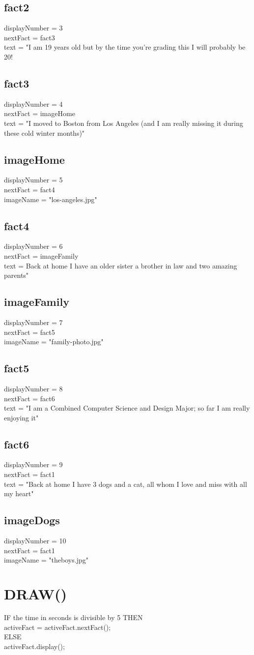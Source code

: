 \documentclass{article}
\begin{document}
        \subsection{fact2}displayNumber = 3 \\nextFact = fact3\\text = "I am 19 years old but by the time you're grading this I will probably be 20!
        \subsection{fact3}
        displayNumber = 4 \\  nextFact = imageHome\\text = "I moved to Boston from Los Angeles (and I am really missing it during these cold winter months)"
        \subsection{imageHome}
        displayNumber = 5 \\nextFact = fact4\\imageName = "los-angeles.jpg"
        \subsection{fact4}
        displayNumber = 6 \\nextFact = imageFamily\\text = Back at home I have an older sister a brother in law and two amazing parents"
        \subsection{imageFamily}
        displayNumber = 7 \\nextFact = fact5\\imageName = "family-photo.jpg"
        \subsection{fact5}
        displayNumber = 8 \\ nextFact = fact6\\ text = "I am a Combined Computer Science and Design Major; so far I am really enjoying it"
        \subsection{fact6}
        displayNumber = 9 \\ nextFact = fact1\\ text = "Back at home I have 3 dogs and a cat, all whom I love and miss with all my heart"
        \subsection{imageDogs}
        displayNumber = 10 \\ nextFact = fact1 \\ imageName = "theboys.jpg"
    \section{DRAW()}
        IF the time in seconds is divisible by 5 THEN \\ \indent activeFact = activeFact.nextFact(); \\ ELSE \\ \indent activeFact.display(); \\ 
\end{document}
